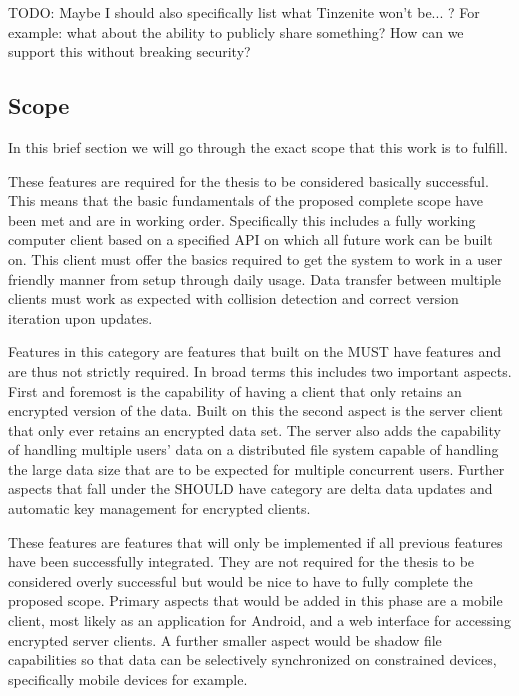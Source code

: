 TODO: Maybe I should also specifically list what Tinzenite won't be... ?
For example: what about the ability to publicly share something?
How can we support this without breaking security?

\subsection{Scope}

In this brief section we will go through the exact scope that this work is to fulfill.

\begin{description}[leftmargin=2em,style=nextline,noitemsep,nolistsep]
\item[MUST have]
    These features are required for the thesis to be considered basically successful.
    This means that the basic fundamentals of the proposed complete scope have been met and are in working order.
    Specifically this includes a fully working computer client based on a specified API on which all future work can be built on.
    This client must offer the basics required to get the system to work in a user friendly manner from setup through daily usage.
    Data transfer between multiple clients must work as expected with collision detection and correct version iteration upon updates.
\item[SHOULD have]
    Features in this category are features that built on the MUST have features and are thus not strictly required.
    In broad terms this includes two important aspects.
    First and foremost is the capability of having a client that only retains an encrypted version of the data.
    Built on this the second aspect is the server client that only ever retains an encrypted data set.
    The server also adds the capability of handling multiple users' data on a distributed file system capable of handling the large data size that are to be expected for multiple concurrent users.
    Further aspects that fall under the SHOULD have category are delta data updates and automatic key management for encrypted clients.
\item[COULD have]
    These features are features that will only be implemented if all previous features have been successfully integrated.
    They are not required for the thesis to be considered overly successful but would be nice to have to fully complete the proposed scope.
    Primary aspects that would be added in this phase are a mobile client, most likely as an application for Android, and a web interface for accessing encrypted server clients.
    A further smaller aspect would be shadow file capabilities so that data can be selectively synchronized on constrained devices, specifically mobile devices for example.
\end{description}

